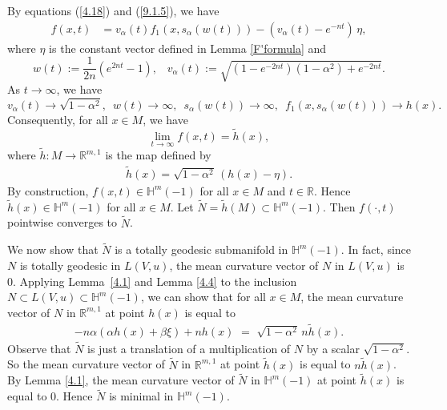 \documentclass[12pt]{article}
\begin{document}
By  equations (\ref{4.18}) and (\ref{9.1.5}), we have
		  \begin{align}
		  	f(x,t) &= v_\alpha(t) f_1(x,s_{\alpha}(w(t)))
		  	      -(v_\alpha(t)-e^{-nt}) \, \eta,   \label{4.21}
		  \end{align}
where $\eta$ is the constant vector defined in Lemma \ref{F'formula} and
\begin{equation} \label{eqn:wv}
w(t) :=\frac{1}{2n}(e^{2nt}-1), \hspace{10pt}
v_\alpha(t) := \sqrt{(1-e^{-2nt})(1-\alpha^2)+e^{-2nt}}.
\end{equation}		
As $t \to \infty$, we have
\begin{equation} \label{eqn:limv}
 v_\alpha(t) \to \sqrt{1-\alpha^2}, \,\,\,
 w(t) \to \infty, \,\,\,
 s_{\alpha}(w(t))	\to \infty, \,\,\,
 f_1(x,s_{\alpha}(w(t))) \to h(x).
\end{equation}
Consequently, for all $x \in M$, we have
\begin{equation} \label{eqn:limf}
 \lim_{t \to \infty} f(x,t) = \tilde{h}(x),
\end{equation}
where $\tilde{h}: M \rightarrow \mathbb R^{m,1}$ is the map defined by
\begin{align} \label{eqn:htilde}
		  	\tilde{h}(x)=\sqrt{1-\alpha^2} \, (h(x)-\eta).
\end{align}
By construction, $f(x,t) \in \mathbb{H}^m(-1)$ for all $x \in M$ and $t \in \mathbb{R}$.
Hence $\tilde{h}(x) \in  \mathbb{H}^m(-1)$ for all $x \in M$.
Let $\tilde{N} = \tilde{h}(M) \subset \mathbb{H}^m(-1)$. Then $f(\cdot, t)$ pointwise converges to $\tilde{N}$.

We now show that $\tilde{N}$ is a totally geodesic submanifold  in $\mathbb{H}^m(-1)$.
In fact, since $N$ is totally geodesic in $L(V, u)$, the mean curvature vector of $N$ in $L(V,u)$ is $0$.
Applying Lemma~\ref{4.1} and Lemma \ref{4.4} to the inclusion
$N \subset L(V,u)\subset \mathbb{H}^m(-1)$,
we can show that for all $x \in M$, the mean curvature vector of $N$ in $\mathbb{R}^{m,1}$ at point $h(x)$ is equal to
\begin{align*}
	-n\alpha(\alpha h(x)+\beta \xi)+nh(x) \,\, = \,\, \sqrt{1-\alpha^2} \, n \tilde{h}(x).
\end{align*}
Observe that $\tilde{N}$ is just a translation of a  multiplication of $N$ by a scalar $\sqrt{1-\alpha^2}$.
So the mean curvature vector of $\tilde N$ in $\mathbb{R}^{m,1}$ at point $\tilde h(x)$ is equal to $n \tilde{h}(x)$.
By Lemma \ref{4.1}, the mean curvature vector of $\tilde N$ in $\mathbb{H}^m(-1)$ at point $\tilde h(x)$
is equal to $0$. Hence $\tilde{N}$ is minimal in $\mathbb{H}^m(-1)$.
\end{document}
